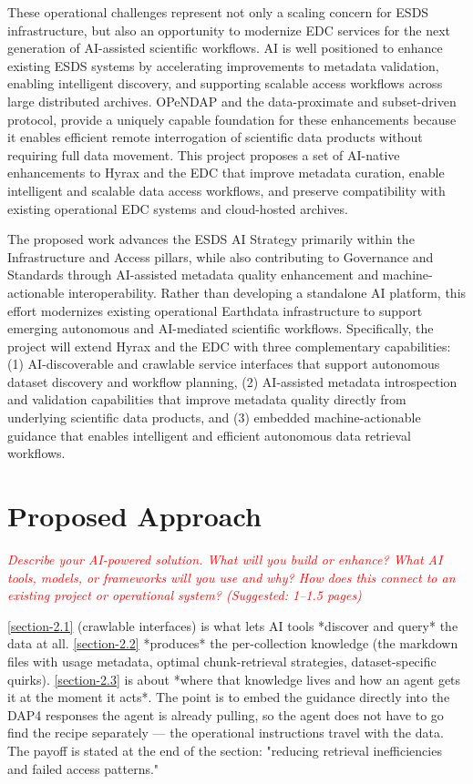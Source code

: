 \documentclass[11pt]{article}
\begin{document}
These operational challenges represent not only a scaling concern for \ac{ESDS} infrastructure, but also an opportunity to modernize \ac{EDC} services for the next generation of \ac{AI}-assisted scientific workflows. \ac{AI} is well positioned to enhance existing \ac{ESDS} systems by accelerating improvements to metadata validation, enabling intelligent discovery, and supporting scalable access workflows across large distributed archives. \ac{OPeNDAP} and the data-proximate and subset-driven protocol, provide a uniquely capable foundation for these enhancements because it enables efficient remote interrogation of scientific data products without requiring full data movement. This project proposes a set of \ac{AI}-native enhancements to Hyrax and the \ac{EDC} that improve metadata curation, enable intelligent and scalable data access workflows, and preserve compatibility with existing operational \ac{EDC} systems and cloud-hosted archives.

The proposed work advances the \ac{ESDS} \ac{AI} Strategy primarily within the Infrastructure and Access pillars, while also contributing to Governance and Standards through \ac{AI}-assisted metadata quality enhancement and machine-actionable interoperability. Rather than developing a standalone \ac{AI} platform, this effort modernizes existing operational Earthdata infrastructure to support emerging autonomous and \ac{AI}-mediated scientific workflows. Specifically, the project will extend Hyrax and the \ac{EDC} with three complementary capabilities: (1) \ac{AI}-discoverable and crawlable service interfaces that support autonomous dataset discovery and workflow planning, (2) \ac{AI}-assisted metadata introspection and validation capabilities that improve metadata quality directly from underlying scientific data products, and (3) embedded machine-actionable guidance that enables intelligent and efficient autonomous data retrieval workflows.

\section{Proposed Approach}
\textcolor{red}{\textit{Describe your AI-powered solution. What will you build or enhance? What AI tools, models, or frameworks will you use and why? How does this connect to an existing project or operational system? (Suggested: 1–1.5 pages)}}

\ref{section-2.1} (crawlable interfaces) is what lets \ac{AI} tools *discover and query* the data at all.
\ref{section-2.2} *produces* the per-collection knowledge (the markdown files with usage metadata, optimal chunk-retrieval strategies, dataset-specific quirks).
\ref{section-2.3} is about *where that knowledge lives and how an agent gets it at the moment it acts*. The point is to embed the guidance directly into the \ac{DAP4} responses the agent is already pulling, so the agent does not have to go find the recipe separately — the operational instructions travel with the data. The payoff is stated at the end of the section: "reducing retrieval inefficiencies and failed access patterns."
\end{document}
